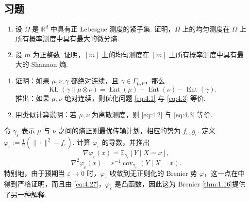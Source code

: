 \subsection{习题}\label{sec:4.6}
\begin{exercise}\label{exer:4.1}\leavevmode
\begin{enumerate}\renewcommand{\labelenumi}{(\alph{enumi})}
\item 设 $\Omega$ 是 $\mathbb R^d$ 中具有正 Lebesgue 测度的紧子集. 证明，$\Omega$ 上的均匀测度在 $\Omega$ 上所有概率测度中具有最大的微分熵.
\item 设 $m$ 为正整数. 证明，$[m]$ 上的均匀测度在 $[m]$ 上所有概率测度中具有最大的 Shannon 熵.
\end{enumerate}
\end{exercise}

\begin{exercise}\label{exer:4.2}\leavevmode
\begin{enumerate}\renewcommand{\labelenumi}{(\alph{enumi})}
\item 证明：如果 $\mu,\nu,\gamma$ 都绝对连续，且 $\gamma\in\Gamma_{\mu,\nu}$，那么
$$\operatorname{KL}(\gamma\|\mu\otimes\nu)
=\operatorname{Ent}(\mu)+\operatorname{Ent}(\nu)-\operatorname{Ent}(\gamma).$$
推出：如果 $\mu,\nu$ 绝对连续，则优化问题 \eqref{eq:4.1} 与 \eqref{eq:4.3} 等价.
\item 用类似计算说明：若 $\mu,\nu$ 为离散测度，则 \eqref{eq:4.2} 与 \eqref{eq:4.3} 等价.
\end{enumerate}
\end{exercise}

\begin{exercise}\label{exer:4.3}
令 $\gamma_\varepsilon$ 表示 $\mu$ 与 $\nu$ 之间的熵正则最优传输计划，相应的势为 $f_\varepsilon,g_\varepsilon$. 定义 $\varphi_\varepsilon:=\frac12(\|\cdot\|^2-f_\varepsilon)$. 计算 $\varphi_\varepsilon$ 的导数，并推出
\begin{equation}\label{eq:4.26}
\nabla\varphi_\varepsilon(x)=\mathbb E_{\gamma_\varepsilon}[Y\mid X=x],
\end{equation}
\begin{equation}\label{eq:4.27}
\nabla^2\varphi_\varepsilon(x)=\varepsilon^{-1}\operatorname{cov}_{\gamma_\varepsilon}(Y\mid X=x).
\end{equation}
特别地，由于预期当 $\varepsilon\to0$ 时，$\varphi_\varepsilon$ 收敛到无正则化的 Brenier 势 $\varphi$，这一点在\cite{ref242}中得到严格证明，而且由 \eqref{eq:4.27}，$\varphi_\varepsilon$ 是凸函数，因此这为 Brenier \autoref{thm:1.16}提供了另一种解释.
\end{exercise}

